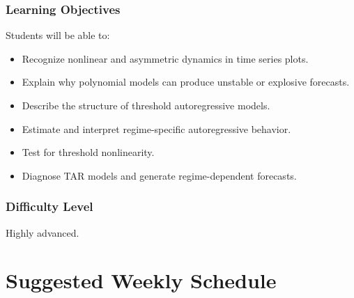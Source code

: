 \documentclass[11pt]{article}
\begin{document}
\subsubsection*{Learning Objectives}
Students will be able to:
\begin{itemize}
    \item Recognize nonlinear and asymmetric dynamics in time series plots.
    \item Explain why polynomial models can produce unstable or explosive forecasts.
    \item Describe the structure of threshold autoregressive models.
    \item Estimate and interpret regime-specific autoregressive behavior.
    \item Test for threshold nonlinearity.
    \item Diagnose TAR models and generate regime-dependent forecasts.
\end{itemize}

\subsubsection*{Difficulty Level}
Highly advanced.

\section{Suggested Weekly Schedule}
\end{document}
